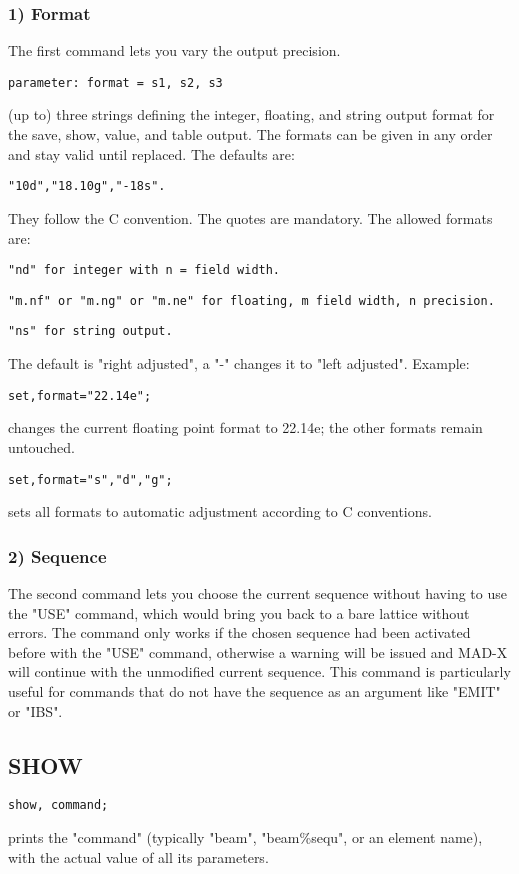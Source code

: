 \subsubsection{1) Format} 
The first command lets you vary the output precision. 
\begin{verbatim}
parameter: format = s1, s2, s3
\end{verbatim} 
(up to) three strings defining the integer, floating, and string output
format for the save, show, value, and table output. The formats can be
given in any order and stay valid until replaced. The defaults are:  
\begin{verbatim}
"10d","18.10g","-18s".
\end{verbatim} 
They follow the C convention. The quotes are mandatory. The allowed formats are: 
\begin{verbatim}
"nd" for integer with n = field width.
\end{verbatim}
\begin{verbatim}
"m.nf" or "m.ng" or "m.ne" for floating, m field width, n precision.
\end{verbatim}
\begin{verbatim}
"ns" for string output.
\end{verbatim} 
The default is "right adjusted", a "-" changes it to "left adjusted".  Example: 
\begin{verbatim}
set,format="22.14e";
\end{verbatim} 
changes the current floating point format to 22.14e; the other formats remain untouched. 
\begin{verbatim}
set,format="s","d","g";
\end{verbatim} 
sets all formats to automatic adjustment according to C conventions. 

\subsubsection{2) Sequence} The second command lets you choose the
current sequence without having to use the "USE" command, which would
bring you back to a bare lattice without errors. The command only works
if the chosen sequence had been activated before with the "USE" command,
otherwise a warning will be issued and MAD-X will continue with the
unmodified current sequence. This command is particularly useful for
commands that do not have the sequence as an argument like "EMIT" or
"IBS". 


\subsection{SHOW}
\begin{verbatim}
show, command;
\end{verbatim} 
prints the "command" (typically "beam", "beam\%sequ", or an element
name), with the actual value of all its parameters.  


